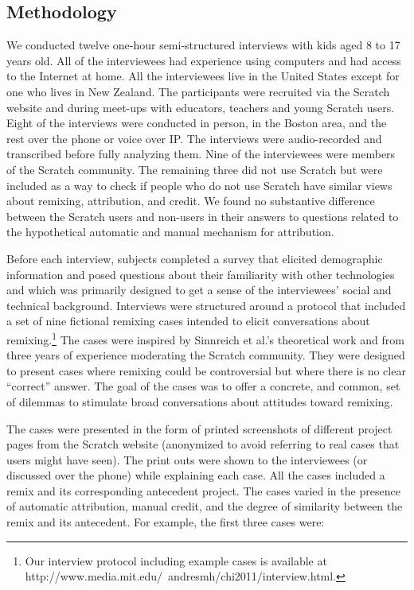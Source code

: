 \subsection{Methodology}

We conducted twelve one-hour semi-structured interviews with kids aged
8 to 17 years old. All of the interviewees had 
experience using
computers and had access to the Internet at home. All the interviewees
live in the United States except for one who lives in New Zealand. The
participants were recruited via the Scratch website and during
meet-ups with educators, teachers and young Scratch users. Eight of
the interviews were conducted in person, in the Boston area, and the
rest over the phone or voice over IP.  The interviews were
audio-recorded and transcribed before fully analyzing them. Nine of
the interviewees were members of the Scratch community.  The remaining
three did not use Scratch but were included as a way to check if
people who do not use Scratch have similar views about remixing,
attribution, and credit. We found no substantive difference between
the Scratch users and non-users in their answers to questions related
to the hypothetical automatic and manual mechanism for attribution.

Before each interview, subjects completed a survey that elicited
demographic information and posed questions about their familiarity
with other technologies and which was primarily designed to get a
sense of the interviewees' social and technical background. Interviews
were structured around a protocol that included a set of nine
fictional remixing cases intended to elicit conversations about
remixing.\footnote{Our interview protocol including example cases is
  available at
  http://www.media.mit.edu/~andresmh/chi2011/interview.html.} The
cases were inspired by Sinnreich et al.'s theoretical work and from
three years of experience moderating the Scratch community. They were
designed to present cases where remixing could be controversial but
where there is no clear ``correct'' answer. The goal of the cases was
to offer a concrete, and common, set of dilemmas to stimulate broad
conversations about attitudes toward remixing.

The cases were presented in the form of printed screenshots of
different project pages from the Scratch website (anonymized to avoid
referring to real cases that users might have seen).
The print outs were shown to the interviewees (or
discussed over the phone) while explaining each case.  All the cases
included a remix and its corresponding antecedent project. The cases varied 
in the presence of automatic attribution, manual credit, and
the degree of similarity between the remix and its antecedent. For example, the
first three cases were:


